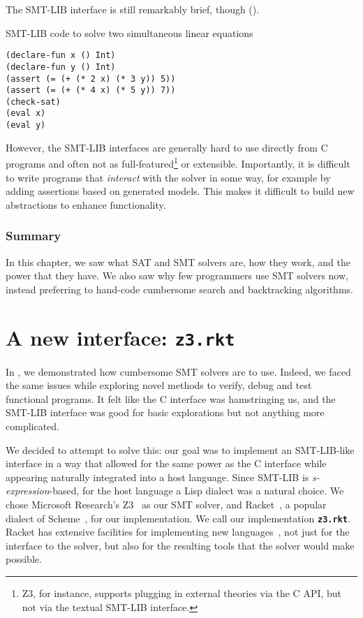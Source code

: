 The SMT-LIB interface is still remarkably brief, though ().

\begin{program}
\caption{SMT-LIB code to solve two simultaneous linear equations}
\label{fig:smtlib-simultaneous}
\begin{verbatim}
(declare-fun x () Int)
(declare-fun y () Int)
(assert (= (+ (* 2 x) (* 3 y)) 5))
(assert (= (+ (* 4 x) (* 5 y)) 7))
(check-sat)
(eval x)
(eval y)
\end{verbatim}
\end{program}

However, the SMT-LIB interfaces are generally hard to use directly from C
programs and often not as full-featured\footnote{Z3, for instance, supports
plugging in external theories via the C API, but not via the textual SMT-LIB
interface.}  or extensible. Importantly, it is difficult to write programs
that \textit{interact} with the solver in some way, for example by adding
assertions based on generated models. This makes it difficult to build new
abstractions to enhance functionality.

\subsection*{Summary}

In this chapter, we saw what SAT and SMT solvers are, how they work, and the
power that they have. We also saw why few programmers use SMT solvers now,
instead preferring to hand-code cumbersome search and backtracking algorithms.

\chapter{A new interface: \texttt{z3.rkt}}

In , we demonstrated how cumbersome SMT solvers are to
use. Indeed, we faced the same issues while exploring novel methods to verify,
debug and test functional programs. It felt like the C interface was
hamstringing us, and the SMT-LIB interface was good for basic explorations but
not anything more complicated.

We decided to attempt to solve this: our goal was to implement an SMT-LIB-like
interface in a way that allowed for the same power as the C interface while
appearing naturally integrated into a host language. Since SMT-LIB is {\em
s-expression}-based, for the host language a Lisp dialect was a natural
choice. We chose Microsoft Research's Z3~\cite{z3} as our SMT solver, and
Racket~\cite{racket}, a popular dialect of Scheme~\cite{scheme-r5rs,scheme-r6rs},
for our implementation. We call our implementation \textbf{\texttt{z3.rkt}}. Racket has
extensive facilities for implementing new languages~\cite{Tobin-Hochstadt:11},
not just for the interface to the solver, but also for the resulting tools
that the solver would make possible.

